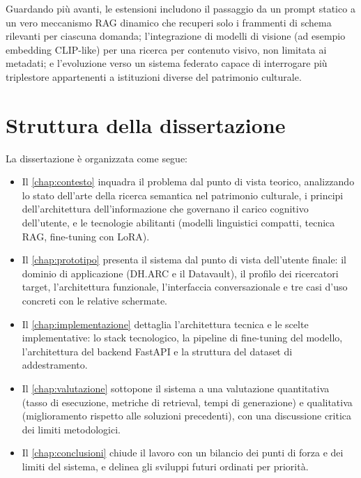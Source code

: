 Guardando più avanti, le estensioni includono il passaggio da un prompt statico a un vero meccanismo RAG dinamico che recuperi solo i frammenti di schema rilevanti per ciascuna domanda; l'integrazione di modelli di visione (ad esempio embedding CLIP-like) per una ricerca per contenuto visivo, non limitata ai metadati; e l'evoluzione verso un sistema federato capace di interrogare più triplestore appartenenti a istituzioni diverse del patrimonio culturale.

\section{Struttura della dissertazione}\label{sec:struttura_dissertazione}

La dissertazione è organizzata come segue:

\begin{itemize}
    \setlength{\itemsep}{0pt}
    \setlength{\parskip}{0pt}
    
    \item Il \cref{chap:contesto} inquadra il problema dal punto di vista teorico, analizzando lo stato dell'arte della ricerca semantica nel patrimonio culturale, i principi dell'architettura dell'informazione che governano il carico cognitivo dell'utente, e le tecnologie abilitanti (modelli linguistici compatti, tecnica RAG, fine-tuning con LoRA).
    
    \item Il \cref{chap:prototipo} presenta il sistema dal punto di vista dell'utente finale: il dominio di applicazione (DH.ARC e il Datavault), il profilo dei ricercatori target, l'architettura funzionale, l'interfaccia conversazionale e tre casi d'uso concreti con le relative schermate.
    
    \item Il \cref{chap:implementazione} dettaglia l'architettura tecnica e le scelte implementative: lo stack tecnologico, la pipeline di fine-tuning del modello, l'architettura del backend FastAPI e la struttura del dataset di addestramento.
    
    \item Il \cref{chap:valutazione} sottopone il sistema a una valutazione quantitativa (tasso di esecuzione, metriche di retrieval, tempi di generazione) e qualitativa (miglioramento rispetto alle soluzioni precedenti), con una discussione critica dei limiti metodologici.
    
    \item Il \cref{chap:conclusioni} chiude il lavoro con un bilancio dei punti di forza e dei limiti del sistema, e delinea gli sviluppi futuri ordinati per priorità.
\end{itemize}